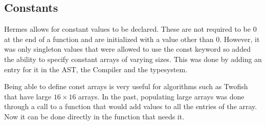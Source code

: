 
\subsection{Constants}
Hermes allows for constant values to be declared.
These are not required to be 0 at the end of a function and are initialized with a value other than 0.
However, it was only singleton values that were allowed to use the const keyword so added the ability to specify constant arrays of varying sizes.
This was done by adding an entry for it in the AST, the Compiler and the typesystem.

Being able to define const arrays is very useful for algorithms such as Twofish that have large $16\times16$ arrays. In the past, populating large arrays was done through a call to a function that would add values to all the entries of the array. Now it can be done directly in the function that needs it.
